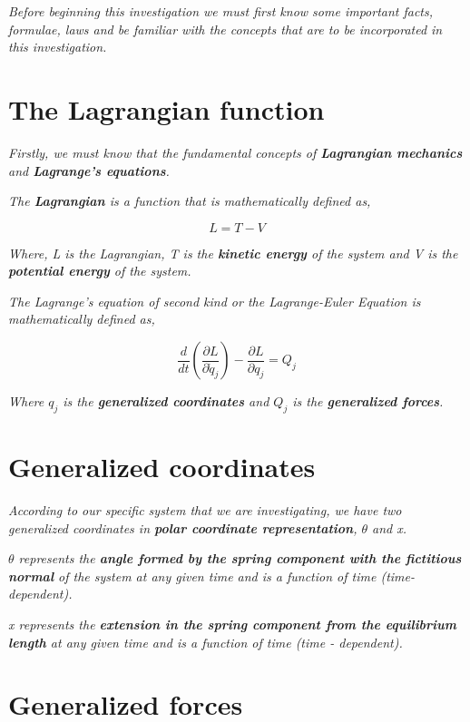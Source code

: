 \textit{Before beginning this investigation we must first know some important facts, formulae, laws and be familiar with the concepts that are to be incorporated in this investigation.}

\section{{The Lagrangian function}}
        
    \textit{Firstly, we must know that the fundamental concepts of \textbf{Lagrangian mechanics} and \textbf{Lagrange's equations}.}
        
    \textit{The \textbf{Lagrangian} is a function that is mathematically defined as,}
        
    $$L = T - V$$
        
    \textit{Where, L is the Lagrangian, T is the \textbf{kinetic energy} of the system and V is the \textbf{potential energy} of the system.}
        
    \textit{The Lagrange's equation of second kind or the Lagrange-Euler Equation is mathematically defined as,}
        
    $$\frac{d}{dt}\left(\frac{\partial L}{\partial \dot{q}_j}\right) - \frac{\partial L}{\partial q_j} = Q_j$$
        
    \textit{Where $q_j$ is the \textbf{generalized coordinates} and $Q_j$ is the \textbf{generalized forces}.}
      
    \section{{Generalized coordinates}}
        
    \textit{According to our specific system that we are investigating, we have two generalized coordinates in \textbf{polar coordinate representation}, $\theta$ and x.}
        
    \textit{$\theta$ represents the \textbf{angle formed by the spring component with the fictitious normal} of the system at any given time and is a function of time (time-dependent).}
        
    \textit{x represents the \textbf{extension in the spring component from the equilibrium length} at any given time and is a function of time (time - dependent).}
            
    \section{{Generalized forces}}
        
